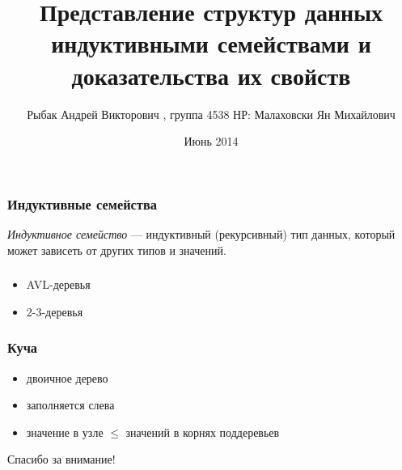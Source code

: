 \documentclass[17pt]{beamer}
\title[Представление структур данных индуктивными семействами и доказательства их свойств]{Представление структур данных индуктивными семействами и доказательства их свойств}
\institute{НИУ ИТМО}
\author[Рыбак А.В.]{Рыбак Андрей Викторович , группа 4538
\newline НР: Малаховски Ян Михайлович}
\date{
Июнь 2014
}
\begin{document}
\maketitle

\begin{frame}
    \frametitle{Индуктивные семейства}
    \emph{Индуктивное семейство} — индуктивный (рекурсивный) тип данных,
        который может зависеть от других типов и значений.
\end{frame}

\begin{frame}
    \frametitle{}
    \begin{itemize}
        \item AVL-деревья
        \item 2-3-деревья
    \end{itemize}
\end{frame}

\AgdaHide{

}

\begin{frame}
    \frametitle{Куча}
    \begin{itemize}
        \item двоичное дерево
        \item заполняется слева
        \item значение в узле $ \leq $ значений в корнях поддеревьев
    \end{itemize}
\end{frame}
\fontsize{14pt}{14pt}\selectfont


\begin{frame}
    \begin{center}
        \Large Спасибо за внимание!
    \end{center}
\end{frame}
\end{document}
